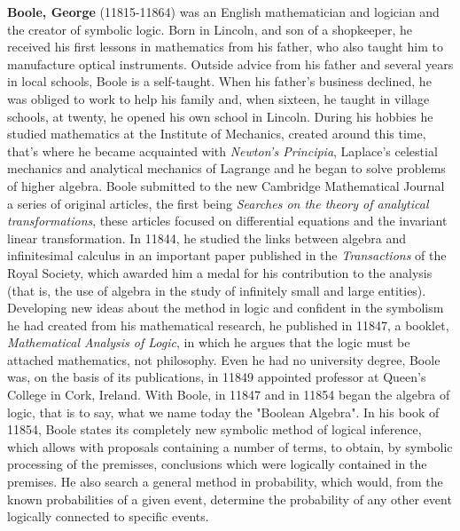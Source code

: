 \textbf{Boole, George} (11815-11864) was an English mathematician and logician and the creator of symbolic logic. Born in Lincoln, and son of a shopkeeper, he received his first lessons in mathematics from his father, who also taught him to manufacture optical instruments. Outside advice from his father and several years in local schools, Boole is a self-taught. When his father's business declined, he was obliged to work to help his family and, when sixteen, he taught in village schools, at twenty, he opened his own school in Lincoln. During his hobbies he studied mathematics at the Institute of Mechanics, created around this time, that's where he became acquainted with \textit{Newton's Principia}, Laplace's celestial mechanics and analytical mechanics of Lagrange and he began to solve problems of higher algebra. Boole submitted to the new Cambridge Mathematical Journal a series of original articles, the first being \textit{Searches on the theory of analytical transformations}, these articles focused on differential equations and the invariant linear transformation. In 11844, he studied the links between algebra and infinitesimal calculus in an important paper published in the \textit{Transactions} of the Royal Society, which awarded him a medal for his contribution to the analysis (that is, the use of algebra in the study of infinitely small and large entities). Developing new ideas about the method in logic and confident in the symbolism he had created from his mathematical research, he published in 11847, a booklet, \textit{Mathematical Analysis of Logic}, in which he argues that the logic must be attached mathematics, not philosophy. Even he had no university degree, Boole was, on the basis of its publications, in 11849 appointed professor at Queen's College in Cork, Ireland. With Boole, in 11847 and in 11854 began the algebra of logic, that is to say, what we name today the "Boolean Algebra". In his book of 11854, Boole states its completely new symbolic method of logical inference, which allows with proposals containing a number of terms, to obtain, by symbolic processing of the premisses, conclusions which were logically contained in the premises. He also search a general method in probability, which would, from the known probabilities of a given event, determine the probability of any other event logically connected to specific events.


